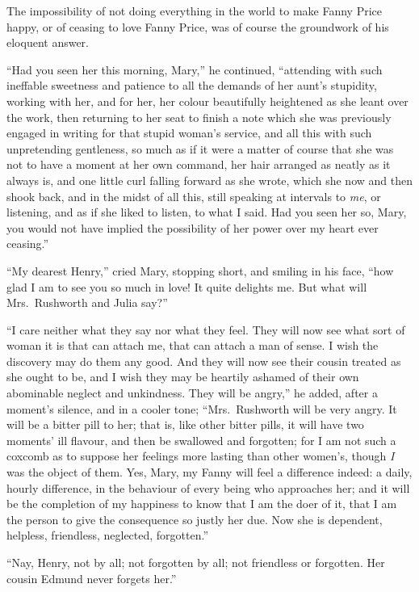 \documentclass{article}
\begin{document}
The impossibility of not doing everything in the world to
make Fanny Price happy, or of ceasing to love Fanny Price,
was of course the groundwork of his eloquent answer.

``Had you seen her this morning, Mary,'' he continued,
``attending with such ineffable sweetness and patience to
all the demands of her aunt's stupidity, working with her,
and for her, her colour beautifully heightened as she
leant over the work, then returning to her seat to finish
a note which she was previously engaged in writing
for that stupid woman's service, and all this with such
unpretending gentleness, so much as if it were a matter
of course that she was not to have a moment at her
own command, her hair arranged as neatly as it always is,
and one little curl falling forward as she wrote, which she
now and then shook back, and in the midst of all this,
still speaking at intervals to \emph{me}, or listening,
and as if she liked to listen, to what I said.
Had you seen her so, Mary, you would not have implied
the possibility of her power over my heart ever ceasing.''

``My dearest Henry,'' cried Mary, stopping short, and smiling
in his face, ``how glad I am to see you so much in love!
It quite delights me.  But what will Mrs.\ Rushworth and
Julia say?''

``I care neither what they say nor what they feel.
They will now see what sort of woman it is that can attach me,
that can attach a man of sense.  I wish the discovery
may do them any good.  And they will now see their cousin
treated as she ought to be, and I wish they may be heartily
ashamed of their own abominable neglect and unkindness.
They will be angry,'' he added, after a moment's silence,
and in a cooler tone; ``Mrs.\ Rushworth will be very angry.
It will be a bitter pill to her; that is, like other
bitter pills, it will have two moments' ill flavour, and then
be swallowed and forgotten; for I am not such a coxcomb
as to suppose her feelings more lasting than other women's,
though \emph{I} was the object of them.  Yes, Mary, my Fanny
will feel a difference indeed:  a daily, hourly difference,
in the behaviour of every being who approaches her;
and it will be the completion of my happiness to know
that I am the doer of it, that I am the person to give
the consequence so justly her due.  Now she is dependent,
helpless, friendless, neglected, forgotten.''

``Nay, Henry, not by all; not forgotten by all; not friendless
or forgotten.  Her cousin Edmund never forgets her.''
\end{document}
